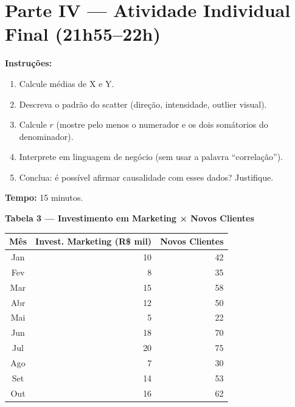\section{Parte IV — Atividade Individual Final (21h55–22h)}

\begin{SolvedBox}
\textbf{Instruções:}
\begin{enumerate}
  \item Calcule médias de X e Y.
  \item Descreva o padrão do scatter (direção, intensidade, outlier visual).
  \item Calcule $r$ (mostre pelo menos o numerador e os dois somátorios do denominador).
  \item Interprete em linguagem de negócio (sem usar a palavra ``correlação'').
  \item Conclua: é possível afirmar causalidade com esses dados? Justifique.
\end{enumerate}
\textbf{Tempo:} 15 minutos.
\end{SolvedBox}

\begin{BoardBox}
\textbf{Tabela 3 — Investimento em Marketing × Novos Clientes}

\medskip
\begin{tabular}{|c|r|r|}
\hline
\textbf{Mês} & \textbf{Invest. Marketing (R\$ mil)} & \textbf{Novos Clientes} \\
\hline
Jan & 10 & 42  \\
Fev & 8  & 35  \\
Mar & 15 & 58  \\
Abr & 12 & 50  \\
Mai & 5  & 22  \\
Jun & 18 & 70  \\
Jul & 20 & 75  \\
Ago & 7  & 30  \\
Set & 14 & 53  \\
Out & 16 & 62  \\
\hline
\end{tabular}
\end{BoardBox}

